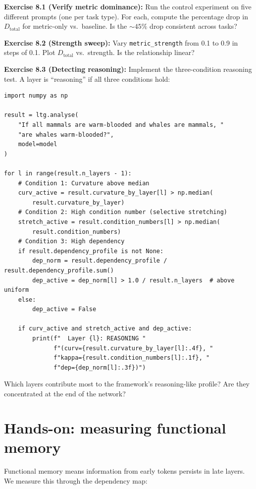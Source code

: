 \documentclass[11pt, twoside, openright]{memoir}
\begin{document}
\begin{tryit}
\textbf{Exercise 8.1 (Verify metric dominance):} Run the control experiment
on five different prompts (one per task type). For each, compute the
percentage drop in $D_{\text{total}}$ for metric-only vs.\ baseline. Is
the ${\sim}45\%$ drop consistent across tasks?

\textbf{Exercise 8.2 (Strength sweep):} Vary \texttt{metric\_strength} from
0.1 to 0.9 in steps of 0.1. Plot $D_{\text{total}}$ vs.\ strength. Is the
relationship linear?

\textbf{Exercise 8.3 (Detecting reasoning):} Implement the three-condition
reasoning test. A layer is ``reasoning'' if all three conditions hold:
\begin{lstlisting}
import numpy as np

result = ltg.analyse(
    "If all mammals are warm-blooded and whales are mammals, "
    "are whales warm-blooded?",
    model=model
)

for l in range(result.n_layers - 1):
    # Condition 1: Curvature above median
    curv_active = result.curvature_by_layer[l] > np.median(
        result.curvature_by_layer)
    # Condition 2: High condition number (selective stretching)
    stretch_active = result.condition_numbers[l] > np.median(
        result.condition_numbers)
    # Condition 3: High dependency
    if result.dependency_profile is not None:
        dep_norm = result.dependency_profile / result.dependency_profile.sum()
        dep_active = dep_norm[l] > 1.0 / result.n_layers  # above uniform
    else:
        dep_active = False

    if curv_active and stretch_active and dep_active:
        print(f"  Layer {l}: REASONING "
              f"(curv={result.curvature_by_layer[l]:.4f}, "
              f"kappa={result.condition_numbers[l]:.1f}, "
              f"dep={dep_norm[l]:.3f})")
\end{lstlisting}
Which layers contribute most to the framework's reasoning-like profile?
Are they concentrated at the end of the network?
\end{tryit}

\section{Hands-on: measuring functional memory}

Functional memory means information from early tokens persists in late
layers. We measure this through the dependency map:
\end{document}
